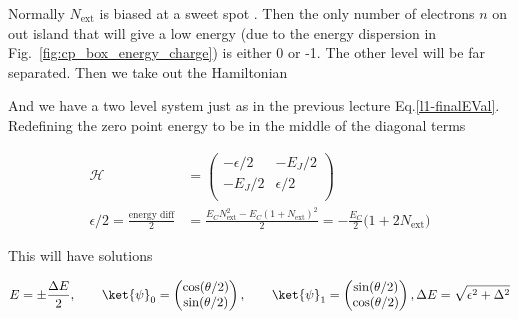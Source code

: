  \noindent  Normally  $  N_\text{ext}  $  is  biased  at  a  sweet  spot
 .  Then the only number of electrons $n$ on out
 island that  will give a  low energy (due  to the energy  dispersion in
 Fig.~\ref{fig:cp_box_energy_charge})  is either  0  or  -1.  The  other
 level will be far separated. Then we take out the Hamiltonian


 \noindent  And we  have a  two  level system  just as  in the  previous
 lecture Eq.\eqref{l1-finalEVal}.   Redefining the zero point  energy to
 be in the middle of the diagonal terms

 \begin{equation}
   \begin{aligned}
     \mathcal{H} & = \begin{pmatrix}
       -\epsilon/2 & -E_J/2\\
       -E_J/2 & \epsilon/2\\
     \end{pmatrix}\\
     \epsilon/2     =      \frac{\text{energy     diff}}{2}      &     =
     \frac{E_CN_\text{ext}^2-E_C(1+N_\text{ext})^2}{2}                 =
     -\frac{E_C}{2}\big(1+2N_\text{ext}\big)
   \end{aligned}
 \end{equation}

\begin{framed}\noindent
  This will have solutions

   \begin{equation}
     E = \pm \frac{\Delta E}{2}, \qquad \ket{\psi}_0 = \begin{pmatrix}
       \cos(\theta/2) \\ \sin(\theta/2)
     \end{pmatrix},  \qquad  \ket{\psi}_1  = \begin{pmatrix}  \sin(\theta/2)  \\
       \cos(\theta/2)
     \end{pmatrix}, \Delta E = \sqrt{\epsilon^2+\Delta^2}
   \end{equation}
 \end{framed}

